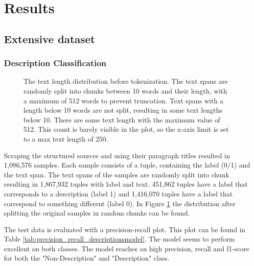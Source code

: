 \documentclass[a4paper, 12pt, oneside]{book} %
\begin{document}
\newpage
\section{Results}
\subsection{Extensive dataset}
\subsubsection{Description Classification}

\begin{figure} [t]
    \centering
    \vspace{0cm}
    \makebox[\textwidth][c]{}
    \caption[Text length distribution for training web crawler model]{The text length distribution before tokenization. The text spans are randomly split into chunks between 10 words and their length, with a maximum of 512 words to prevent truncation. Text spans with a length below 10 words are not split, resulting in some text lengths below 10. There are some text length with the maximum value of 512. This count is barely visible in the plot, so the x-axis limit is set to a max text length of 250.}
    \label{fig:text_length_distribution}
\end{figure}

Scraping the structured sources and using their paragraph titles resulted in 1,086,576 samples.
Each sample consists of a tuple, containing the label (0/1) and the text span.
The text spans of the samples are randomly split into chunk resulting in 1,867,932 tuples with label and text.
451,862 tuples have a label that corresponds to a description (label 1) and 1,416,070 tuples have a label that correspond to something different (label 0).
In Figure \ref{fig:text_length_distribution} the distribution after splitting the original samples in random chunks can be found.

The test data is evaluated with a precision-recall plot.
This plot can be found in Table \ref{tab:precision_recall_descriptionsmodel}.
The model seems to perform excellent on both classes.
The model reaches an high precision, recall and f1-score for both the "Non-Description" and "Description" class.
\end{document}
